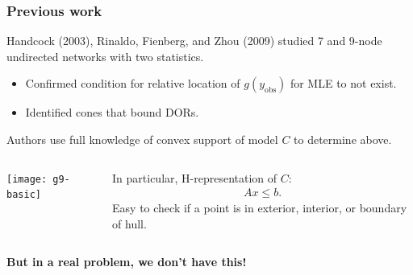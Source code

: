\documentclass[slidestop,compress, 10pt]{beamer}
\newcommand{\yobs}{y_{\text{obs}}}
\begin{document}
%
%
\frame
{
  \frametitle{Previous work}  
Handcock (2003), Rinaldo, Fienberg, and Zhou (2009) studied 7 and 9-node undirected networks
with two statistics.
\begin{itemize}
	\item Confirmed condition for relative location of $g(\yobs)$ for MLE to not exist.  
	\item Identified cones that bound DORs.%
\end{itemize}
\pause
Authors use full knowledge of convex support of model $C$ to determine above.

\begin{columns}[]
\begin{column}[T]{0.4\textwidth}
\texttt{[image: g9-basic]}
\end{column}

\begin{column}[t]{0.6\textwidth}

In particular, H-representation of $C$:
\begin{align*}
	Ax \leq b.
\end{align*}
Easy to check if a point is in exterior, interior, or boundary of hull.

\end{column}
\end{columns}

\pause
\textbf{But in a real problem, we don't have this!}

}

\end{document}
